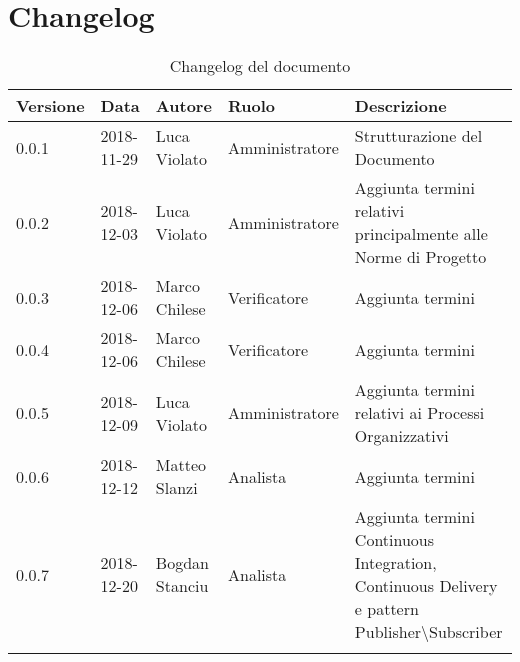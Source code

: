 \section{Changelog}

\begin{center}
\begin{longtable}[c]{|m{}|m{}|m{}|m{}|p{}|}
\hline
\textbf{Versione} & \textbf{Data} & \textbf{Autore} & \textbf{Ruolo} & \textbf{Descrizione} \\
\hline \hline
\endfirsthead
0.0.1 & 2018-11-29 & Luca Violato & Amministratore & Strutturazione del Documento \\
\hline
0.0.2 & 2018-12-03 & Luca Violato & Amministratore & Aggiunta termini relativi principalmente alle Norme di Progetto \\
\hline
0.0.3 & 2018-12-06 & Marco Chilese & Verificatore & Aggiunta termini\\
\hline 
0.0.4 & 2018-12-06 & Marco Chilese & Verificatore & Aggiunta termini\\
\hline
0.0.5 & 2018-12-09 & Luca Violato & Amministratore & Aggiunta termini relativi ai Processi Organizzativi\\
\hline
0.0.6 & 2018-12-12 & Matteo Slanzi & Analista & Aggiunta termini\\
\hline
0.0.7 & 2018-12-20 & Bogdan Stanciu & Analista & Aggiunta termini Continuous Integration, Continuous Delivery e pattern Publisher\textbackslash Subscriber\\
\hline
\caption{Changelog del documento}
\end{longtable}
\end{center}
